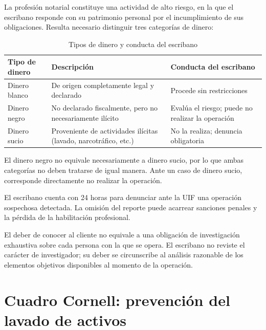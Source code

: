 \documentclass[12pt,oneside]{book}
\begin{document}
La profesión notarial constituye una actividad de alto riesgo, en la que el escribano responde con su patrimonio personal por el incumplimiento de sus obligaciones. Resulta necesario distinguir tres categorías de dinero:

\begin{table}[H]
\centering
\caption{Tipos de dinero y conducta del escribano}
\begin{tabularx}{\textwidth}{>{\raggedright\arraybackslash}X >{\raggedright\arraybackslash}X >{\raggedright\arraybackslash}X}
\toprule
\textbf{Tipo de dinero} & \textbf{Descripción} & \textbf{Conducta del escribano} \\
\midrule
Dinero blanco & De origen completamente legal y declarado & Procede sin restricciones \\
Dinero negro & No declarado fiscalmente, pero no necesariamente ilícito & Evalúa el riesgo; puede no realizar la operación \\
Dinero sucio & Proveniente de actividades ilícitas (lavado, narcotráfico, etc.) & No la realiza; denuncia obligatoria \\
\bottomrule
\end{tabularx}
\end{table}

El dinero negro no equivale necesariamente a dinero sucio, por lo que ambas categorías no deben tratarse de igual manera. Ante un caso de dinero sucio, corresponde directamente no realizar la operación.

\begin{important}
El escribano cuenta con 24 horas para denunciar ante la UIF una operación sospechosa detectada. La omisión del reporte puede acarrear sanciones penales y la pérdida de la habilitación profesional.
\end{important}

\begin{note}
El deber de conocer al cliente no equivale a una obligación de investigación exhaustiva sobre cada persona con la que se opera. El escribano no reviste el carácter de investigador; su deber se circunscribe al análisis razonable de los elementos objetivos disponibles al momento de la operación.
\end{note}

\section{Cuadro Cornell: prevención del lavado de activos}
\end{document}
